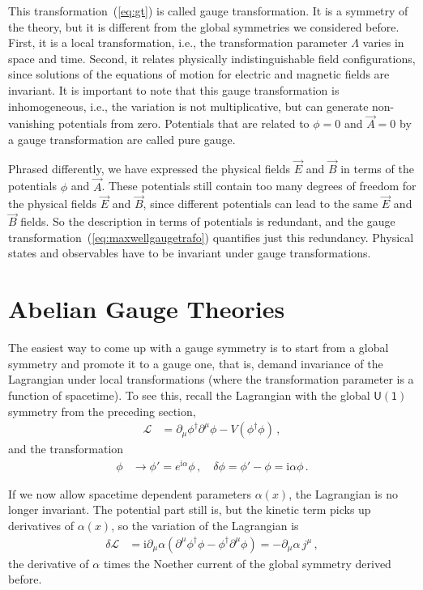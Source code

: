 \documentclass[12pt]{report}
\renewcommand{\L}{\ensuremath{\mathscr{L}}}
\renewcommand{\i}{\ensuremath{\text{i}}}
\newcommand{\2}{\ensuremath{\sqrt{2}\,}}
\renewcommand{\L}{\ensuremath{\mathscr{L}}}
\begin{document}
{      This transformation~(\ref{eq:gt}) is called gauge transformation.
       It is a symmetry of the theory, but it
      is different from the global symmetries we considered before. First, it is a local
      transformation, i.e., the transformation parameter $\Lambda$ varies in space and
      time. Second, it relates physically indistinguishable field configurations, since solutions 
      of the equations of motion for electric and magnetic fields are
      invariant. It is important to note that this gauge transformation is inhomogeneous, i.e.,
      the variation is not multiplicative, but can generate non-vanishing potentials from zero.
      Potentials that are related to $\phi=0$ and $\vec{A}=0$ by a gauge
      transformation are called pure gauge.
      
      Phrased differently, we have expressed the physical fields $\vec{E}$ and $\vec{B}$ in terms 
      of the potentials $\phi$ and $\vec{A}$. These potentials still contain too many degrees of
      freedom for the
      physical fields $\vec{E}$ and $\vec{B}$, since different potentials can lead to the
      same  $\vec{E}$ and $\vec{B}$ fields. So the description in terms of potentials is
      redundant, and the gauge transformation~(\ref{eq:maxwellgaugetrafo}) quantifies just
      this redundancy. Physical states and observables have to be
      invariant under gauge transformations. 
      

    \section{Abelian Gauge Theories}
      The easiest way to come up with a gauge symmetry is to start from a global symmetry and promote
      it to a gauge one, that is, demand invariance of the Lagrangian under local
      transformations (where the transformation parameter is a function of spacetime). To see
      this, recall the Lagrangian with the global $\mathsf{U(1)}$ symmetry from the preceding
      section, 
      \begin{align*}
        \L&=\partial_\mu \phi^\dagger \partial^\mu\phi - V(\phi^\dagger\phi)\,,
      \end{align*}
      and the transformation
      \begin{align*}
        \phi&\to\phi' = e^{\i\alpha} \phi\,,\quad \delta\phi = \phi'-\phi = \i \alpha \phi\,.
      \end{align*}
      
      If we now allow spacetime dependent parameters $\alpha(x)$, the Lagrangian is no longer
      invariant. The potential part still is, but the kinetic term picks up derivatives of
      $\alpha(x)$, so the variation of the Lagrangian is
      \begin{align}
        \delta \L&= \i \partial_\mu \alpha \left(\partial^\mu\phi^\dagger \phi -\phi^\dagger
          \partial^\mu \phi\right) = -\partial_\mu\alpha \,j^\mu\,,
      \end{align}
      the derivative of $\alpha$ times the Noether current of the global symmetry derived
      before. 

}
\end{document}
